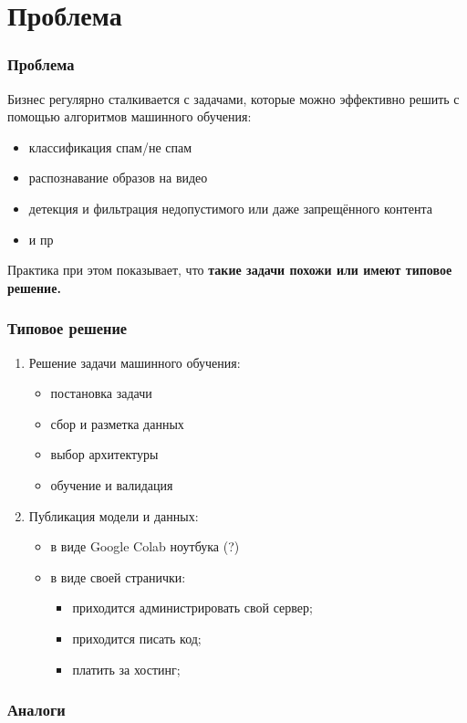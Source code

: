 \section{Проблема}
\begin{frame}
\frametitle{Проблема}
Бизнес регулярно сталкивается с задачами, которые можно эффективно решить с помощью алгоритмов машинного обучения:
\begin{itemize}
    \item классификация спам/не спам
    \item распознавание образов на видео
    \item детекция и фильтрация недопустимого или даже запрещённого контента
    \item и пр
\end{itemize}

Практика при этом показывает, что \textbf{такие задачи похожи или имеют типовое решение.}

\end{frame}

\begin{frame}
\frametitle{Типовое решение}
\begin{enumerate}
    \item Решение задачи машинного обучения:
    \begin{itemize}
        \item постановка задачи
        \item сбор и разметка данных
        \item выбор архитектуры
        \item обучение и валидация
    \end{itemize}
    \item Публикация модели и данных:
    \begin{itemize}
        \item в виде Google Colab ноутбука (?)
        \item в виде своей странички:
        \begin{itemize}
            \item приходится администрировать свой сервер;
            \item приходится писать код;
            \item платить за хостинг;
        \end{itemize}
    \end{itemize}
\end{enumerate}
\end{frame}

\begin{frame}
\frametitle{Аналоги}
\end{frame}
